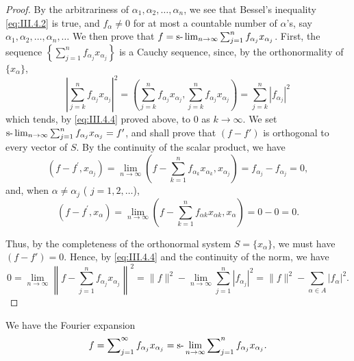 \begin{proof}
By the arbitrariness of $\alpha_{1},\alpha_{2},\ldots ,\alpha_{n}$, we see that Bessel's inequality \eqref{eq:III.4.2} is true, and $f_{\alpha}\neq 0$ for at most a countable number of $\alpha$'s, say $\alpha_{1},\alpha_{2},\ldots ,\alpha_{n},\ldots$ We then prove that $f = \text{s-}\lim\nolimits_{n\to \infty}\sum\nolimits_{j=1}^{n}f_{\alpha_j}x_{\alpha_j}$. First, the sequence $\left\{\sum\limits_{j=1}^{n}f_{\alpha_j}x_{\alpha_j}\right\}$ is a Cauchy sequence, since, by the orthonormality of $\{x_{\alpha}\}$, 
\[
\left| \sum\limits_{j=k} ^{n} f _ {\alpha_{j}} x _ {\alpha_{j}} \right| ^{2} = \left(\sum\limits_{j=k} ^{n} f _ {\alpha_{j}} x _ {\alpha_{j}}, \sum\limits_{j=k} ^{n} f _ {\alpha_{j}} x _ {\alpha_{j}}\right) = \sum\limits_{j=k} ^{n} | f _ {\alpha_{j}} | ^{2}
\]
which tends, by \eqref{eq:III.4.4} proved above, to $0$ as $k \to \infty$. We set $\text{s-}\lim\nolimits_{n \to \infty} \sum\nolimits_{j=1}^{n} f_{\alpha_j} x_{\alpha_j} = f'$, and shall prove that $(f - f')$ is orthogonal to every vector of $S$. By the continuity of the scalar product, we have 
\[
(f - f ^{\prime}, x _ {\alpha_{j}}) = \lim\limits _{n \rightarrow \infty} \left(f - \sum\limits_{k=1} ^{n} f _ {\alpha_{k}} x _ {\alpha_{k}}, x _ {\alpha_{j}}\right) = f _ {\alpha_{j}} - f _ {\alpha_{j}} = 0,
\]
and, when $\alpha \neq \alpha_{j}$ ( $j = 1, 2, \ldots$), 
\[
(f - f ^{\prime}, x _{\alpha}) = \lim\limits _{n \rightarrow \infty} \left(f - \sum\limits_{k=1} ^{n} f _{\alpha k} x _{\alpha k}, x _{\alpha}\right) = 0 - 0 = 0.
\]

Thus, by the completeness of the orthonormal system $S = \{x_{\alpha}\}$, we must have $(f - f') = 0$. Hence, by \eqref{eq:III.4.4} and the continuity of the norm, we have 
\[
0 = \lim\limits _{n \rightarrow \infty} \left\| f - \sum\limits_{j=1} ^{n} f _ {\alpha_{j}} x _ {\alpha_{j}} \right\| ^{2} = \| f \| ^{2} - \lim\limits _{n \rightarrow \infty} \sum\limits_{j=1} ^{n} | f _ {\alpha_{j}} | ^{2} = \| f \| ^{2} - \sum\limits_{\alpha \in A} | f _{\alpha} | ^{2}.
\]
\end{proof}

\begin{corollary}\label{cor:III.4.Corollary.1} We have the Fourier expansion 
\begin{equation}\label{eq:III.4.5}
f = \sum\nolimits_{j=1} ^{\infty} f _ {\alpha_{j}} x _ {\alpha_{j}} = \text{s-}\lim _{n \rightarrow \infty} \sum\nolimits_{j=1} ^{n} f _ {\alpha_{j}} x _ {\alpha_{j}}.
\end{equation}
\end{corollary}

